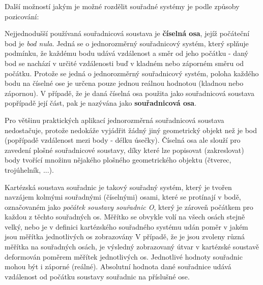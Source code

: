 \vskip 4mm
\vskip 4mm

Další možností jakým je možné rozdělit souřadné systémy je podle způsoby pozicování:

\vskip 4mm
\vskip 4mm




Nejjednodušší používaná souřadnicová soustava je {\bf číselná osa}, jejíž počáteční bod je {\it bod nula}. Jedná se o jednorozměrný souřadnicový systém, který splňuje podmínku, že každému bodu udává vzdálenost a směr od jeho počátku - daný bod se nachází v určité vzdálenosti buď v kladném nebo záporném směru od počátku. Protože se jedná o jednorozměrný souřadnicový systém, poloha každého bodu na číselné ose je  určena pouze jednou reálnou hodnotou (kladnou nebo zápornou). V případě, že je daná číselná osa použita jako souřadnicová soustava popřípadě její část, pak je nazývána jako {\bf souřadnicová osa}.

\vskip 4mm
\centerline{ }
\vskip 4mm


Pro většinu praktických aplikací jednorozměrná souřadnicová soustava nedostačuje, protože nedokáže vyjádřit žádný jiný geometrický objekt než je bod (popřípadě vzdálenost mezi body - délku úsečky). Číselná osa ale slouží pro zavedení plošné souřadnicové soustavy, díky které lze popisovat (zakreslovat) body tvořící množinu nějakého plošného geometrického objektu (čtverec, trojúhelník, ...).


Kartézská soustava souřadnic je takový souřadný systém, který je tvořen navzájem kolmými souřadnými (číselnými) osami, které se protínají v bodě, označovaném jako {\it počátek soustavy souřadnic O}, který je zároveň počátkem pro každou z těchto souřadných os. Měřítko se obvykle volí na všech osách stejně velký, nebo je v definici kartézského souřadného systému udán poměr v jakém jsou měřítka jednotlivých os zobrazovány V případě, že je jsou zvoleny různá měřítka na souřadných osách, je výsledný zobrazovaný útvar v kartézské soustavě deformován poměrem měřítek jednotlivých os. Jednotlivé hodnoty souřadnic mohou být i záporné (reálné). Absolutní hodnota dané souřadnice udává vzdálenost od počátku soustavy souřadnic na příslušné ose.

